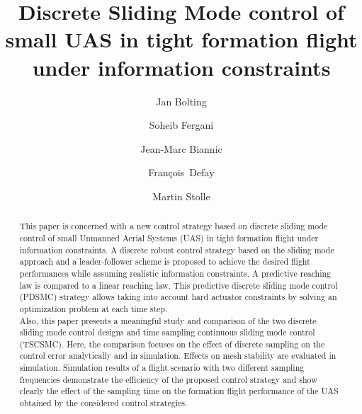 \documentclass{ifacconf}
\newcommand{\Francois}{\mbox{Fran\c{c}ois Defa$\ddot{\textrm{y}}$}}
\begin{document}
\begin{frontmatter}

\title{Discrete Sliding Mode control of small UAS in tight formation flight under information constraints}

\author[First]{Jan Bolting}
\author[First]{Soheib Fergani}
\author[Second]{Jean-Marc Biannic}
\author[First]{\Francois}
\author[Second]{Martin Stolle}

\address[First]{Institut Supérieur de l'Aéronautique et de l'Espace (ISAE),
   31055 Toulouse, France (e-mail: jan.bolting@isae.fr, soheib.fergani@isae.fr, francois.defay@isae.fr)}
\address[Second]{Office National d'Études et de Recherches Aérospatiales (ONERA),
   31055 Toulouse, France (e-mail: jean-marc.biannic@onera.fr, martin.stolle@onera.fr)}
   

\begin{abstract}
This paper is concerned with a new control strategy  based on discrete sliding mode control of small Unmanned Aerial Systems (UAS) in tight formation flight under information constraints. 
A discrete robust control strategy based on the sliding mode approach and a leader-follower scheme is proposed to achieve the desired flight performances while assuming realistic information constraints.
A predictive reaching law is compared to a linear reaching law. This predictive discrete sliding mode control (PDSMC) strategy allows taking into account hard actuator constraints by solving an optimization problem at each time step.\\
Also, this paper presents a meaningful study and comparison of the two discrete sliding mode control designs and time sampling continuous sliding mode control (TSCSMC). 
Here, the comparison focuses on the effect of discrete sampling on the control error analytically and in simulation. Effects on mesh stability are evaluated in simulation.
Simulation results of a flight scenario with two different sampling frequencies demonstrate the efficiency of the proposed control strategy and show clearly the effect of the sampling time on the formation flight performance of the UAS obtained by the considered control strategies.


\end{abstract}
\end{frontmatter}
\end{document}
